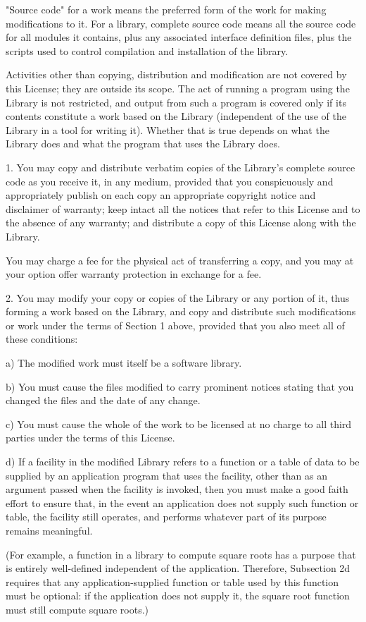 "Source code" for a work means the preferred form of the work for
making modifications to it. For a library, complete source code means
all the source code for all modules it contains, plus any associated
interface definition files, plus the scripts used to control compilation
and installation of the library.

Activities other than copying, distribution and modification are not
covered by this License; they are outside its scope. The act of
running a program using the Library is not restricted, and output from
such a program is covered only if its contents constitute a work based
on the Library (independent of the use of the Library in a tool for
writing it). Whether that is true depends on what the Library does
and what the program that uses the Library does.

1. You may copy and distribute verbatim copies of the Library's
complete source code as you receive it, in any medium, provided that
you conspicuously and appropriately publish on each copy an
appropriate copyright notice and disclaimer of warranty; keep intact
all the notices that refer to this License and to the absence of any
warranty; and distribute a copy of this License along with the
Library.

You may charge a fee for the physical act of transferring a copy,
and you may at your option offer warranty protection in exchange for a
fee.

2. You may modify your copy or copies of the Library or any portion
of it, thus forming a work based on the Library, and copy and
distribute such modifications or work under the terms of Section 1
above, provided that you also meet all of these conditions:

\begin{indented}{1cm}
a) The modified work must itself be a software library.

b) You must cause the files modified to carry prominent notices
stating that you changed the files and the date of any change.

c) You must cause the whole of the work to be licensed at no
charge to all third parties under the terms of this License.

d) If a facility in the modified Library refers to a function or a
table of data to be supplied by an application program that uses
the facility, other than as an argument passed when the facility
is invoked, then you must make a good faith effort to ensure that,
in the event an application does not supply such function or
table, the facility still operates, and performs whatever part of
its purpose remains meaningful.

(For example, a function in a library to compute square roots has
a purpose that is entirely well-defined independent of the
application. Therefore, Subsection 2d requires that any
application-supplied function or table used by this function must
be optional: if the application does not supply it, the square
root function must still compute square roots.) 
\end{indented}

